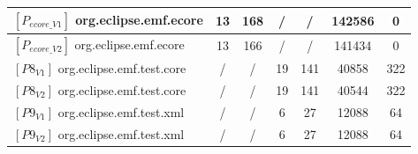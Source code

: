 \begin{table}[t]
{\begin{tabular}{lcccccc}
			\midrule		
			\midrule
			$[P_{ecore\_V1}]$ org.eclipse.emf.ecore & 13 & 168& /& / & 142586 & 0 \\
			\midrule
			$[P_{ecore\_V2}]$ org.eclipse.emf.ecore & 13 & 166 & /  & / & 141434 & 0 \\ 
			
			\midrule
			
			
			$[P8_{V1}]$ org.eclipse.emf.test.core & / & / &19 & 141 & 40858 & 322 \\
			\midrule
			$[P8_{V2}]$ org.eclipse.emf.test.core & / & / &19  & 141 & 40544 & 322 \\ 
			
			\midrule
			
			$[P9_{V1}]$ org.eclipse.emf.test.xml & / & / & 6& 27 & 12088 & 64 \\
			\midrule
			$[P9_{V2}]$ org.eclipse.emf.test.xml & /& / &6  & 27 & 12088 & 64 \\ 
			
			
			\bottomrule		
		\end{tabular}
	}
	
\end{table}

